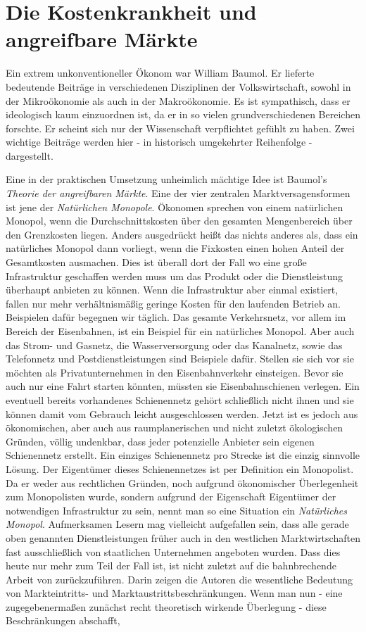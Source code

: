 \section{Die Kostenkrankheit und angreifbare Märkte}
\label{Disease}
Ein extrem unkonventioneller Ökonom war William Baumol. Er lieferte bedeutende Beiträge in verschiedenen Disziplinen der Volkswirtschaft, sowohl in der Mikroökonomie als auch in der Makroökonomie. Es ist sympathisch, dass er ideologisch kaum einzuordnen ist, da er in so vielen grundverschiedenen Bereichen forschte. Er scheint sich nur der Wissenschaft verpflichtet gefühlt zu haben. Zwei wichtige Beiträge werden hier - in historisch umgekehrter Reihenfolge - dargestellt.

Eine in der praktischen Umsetzung unheimlich mächtige Idee ist Baumol's \textit{Theorie der angreifbaren Märkte}. Eine der vier zentralen Marktversagensformen ist jene der \textit{Natürlichen Monopole}. Ökonomen sprechen von einem natürlichen Monopol, wenn die Durchschnittskosten über den gesamten Mengenbereich über den Grenzkosten liegen. Anders ausgedrückt heißt das nichts anderes als, dass ein natürliches Monopol dann vorliegt, wenn die Fixkosten einen hohen Anteil der Gesamtkosten ausmachen. Dies ist überall dort der Fall wo eine große Infrastruktur geschaffen werden muss um das Produkt oder die Dienstleistung überhaupt anbieten zu können. Wenn die Infrastruktur aber einmal existiert, fallen nur mehr verhältnismäßig geringe Kosten für den laufenden Betrieb an. Beispielen dafür begegnen wir täglich. Das gesamte Verkehrsnetz, vor allem im Bereich der Eisenbahnen, ist ein Beispiel für ein natürliches Monopol. Aber auch das Strom- und Gasnetz, die Wasserversorgung oder das Kanalnetz, sowie das Telefonnetz und Postdienstleistungen sind Beispiele dafür. Stellen sie sich vor sie möchten als Privatunternehmen in den Eisenbahnverkehr einsteigen. Bevor sie auch nur eine Fahrt starten könnten, müssten sie Eisenbahnschienen verlegen. Ein eventuell bereits vorhandenes Schienennetz gehört schließlich nicht ihnen und sie können damit vom Gebrauch leicht ausgeschlossen werden. Jetzt ist es jedoch aus ökonomischen, aber auch aus raumplanerischen und nicht zuletzt ökologischen Gründen, völlig undenkbar, dass jeder potenzielle Anbieter sein eigenen Schienennetz erstellt. Ein einziges Schienennetz pro Strecke ist die einzig sinnvolle Lösung. Der Eigentümer dieses Schienennetzes ist per Definition ein Monopolist. Da er weder aus rechtlichen Gründen, noch aufgrund ökonomischer Überlegenheit zum Monopolisten wurde, sondern aufgrund der Eigenschaft Eigentümer der notwendigen Infrastruktur zu sein, nennt man so eine Situation ein \textit{Natürliches Monopol}. Aufmerksamen Lesern mag vielleicht aufgefallen sein, dass alle gerade oben genannten Dienstleistungen früher auch in den westlichen Marktwirtschaften fast ausschließlich von staatlichen Unternehmen angeboten wurden. Dass dies heute nur mehr zum Teil der Fall ist, ist nicht zuletzt auf die bahnbrechende Arbeit von \textcite{Baumol1982, Baumol1982b} zurückzuführen. Darin zeigen die Autoren die wesentliche Bedeutung von Markteintritts- und Marktaustrittsbeschränkungen.  Wenn man nun - eine zugegebenermaßen zunächst recht theoretisch wirkende Überlegung - diese Beschränkungen abschafft, 